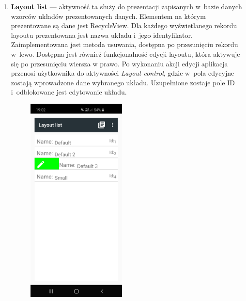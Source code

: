 \documentclass[a4paper,12pt, twoside]{article}
\begin{document}
\begin{enumerate}
           \item \textbf{Layout list} — aktywność ta służy do prezentacji zapisanych w~bazie danych wzorców układów prezentowanych danych. Elementem na którym prezentowane są dane jest RecycleView. Dla każdego wyświetlanego rekordu layoutu prezentowana jest nazwa układu i~jego identyfikator. Zaimplementowana jest metoda usuwania, dostępna po przesunięciu rekordu w~lewo. Dostępna jest również funkcjonalność edycji layoutu, która aktywuje się po przesunięciu wiersza w prawo. Po wykonaniu akcji edycji aplikacja przenosi użytkownika do aktywności \textit{Layout control}, gdzie w~pola edycyjne zostają wprowadzone dane wybranego układu. Uzupełnione zostaje pole ID i~odblokowane jest edytowanie układu. 
           \begin{figure}[H]
    	        \centering
    	        \begin{minipage}{.5\textwidth}
                    \centering
    	            \includegraphics[width=5cm]{images/view_layoutList.jpg}
                    \label{fig:layoutlist}
                \end{minipage}%
    	        \begin{minipage}{.5\textwidth}
    	            \centering

\end{minipage}
\end{figure}
\end{enumerate}
\end{document}

